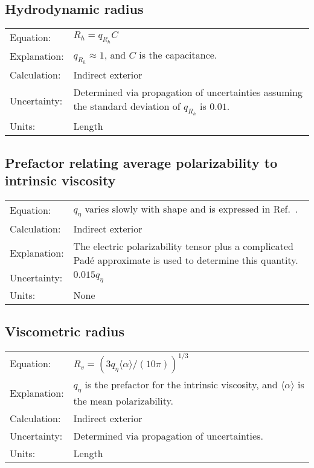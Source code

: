 \documentclass[12pt,letterpaper]{article}
\begin{document}
\subsection{Hydrodynamic radius}
\begin{tabular}{p{1in} p{5.5in}}
Equation: & $R_{h}=q_{R_{h}}C$  \\
Explanation: &  $q_{R_{h}}\approx 1$, and $C$ is the capacitance.\\
Calculation: & Indirect exterior  \\
Uncertainty:& Determined via propagation of uncertainties assuming the standard deviation of $q_{R_{h}}$ is $0.01$. \\
Units: & Length \\
\end{tabular}

\subsection{Prefactor relating average polarizability to intrinsic viscosity}
\begin{tabular}{p{1in} p{5.5in}}
Equation: & $q_\eta$ varies slowly with shape and is expressed in Ref.~\cite{Mansfield2008}.\\
Calculation: & Indirect exterior  \\
Explanation: & The electric polarizability tensor plus a complicated Pad\'e approximate is used to determine this quantity. \\
Uncertainty: & $0.015q_\eta$ \\
Units: & None \\
\end{tabular}

\subsection{Viscometric radius}
\begin{tabular}{p{1in} p{5.5in}}
Equation: & $R_{v}= (3 q_\eta \langle \alpha \rangle/(10 \pi))^{1/3}$  \\
Explanation: &  $q_\eta$ is the prefactor for the intrinsic viscosity, and $\langle \alpha \rangle$ is the mean polarizability.\\
Calculation: & Indirect exterior  \\
Uncertainty:& Determined via propagation of uncertainties.\\
Units: & Length \\
\end{tabular}
\end{document}
